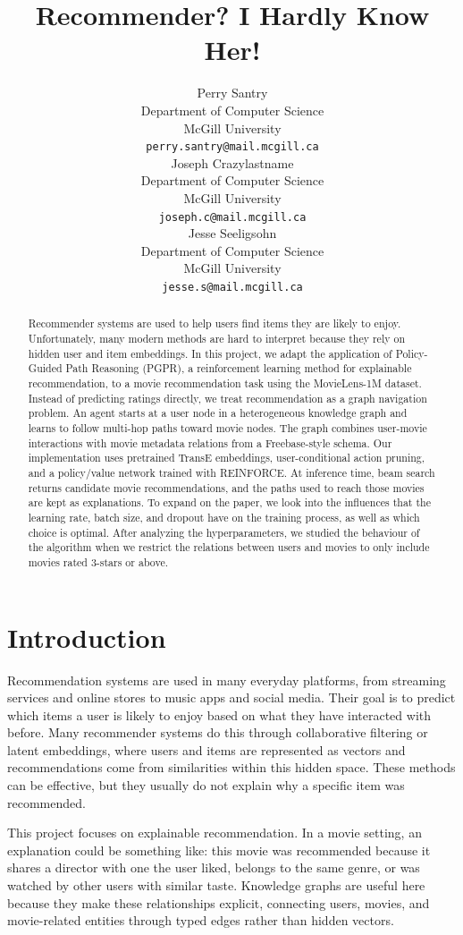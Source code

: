 \documentclass{article}
\title{Recommender? I Hardly Know Her!}
\author{%
  Perry Santry \\
  Department of Computer Science\\
  McGill University\\
  \texttt{perry.santry@mail.mcgill.ca} \\
  \And
  Joseph Crazylastname \\
  Department of Computer Science\\
  McGill University\\
  \texttt{joseph.c@mail.mcgill.ca} \\
  \And
  Jesse Seeligsohn \\
  Department of Computer Science\\
  McGill University\\
  \texttt{jesse.s@mail.mcgill.ca} \\
}
\begin{document}
\maketitle

\begin{abstract}
Recommender systems are used to help users find items they are likely to enjoy. Unfortunately, many modern methods are hard to interpret because they rely on hidden user and item embeddings. 
In this project, we adapt the application of Policy-Guided Path Reasoning (PGPR), a reinforcement learning method for explainable recommendation, to a movie recommendation task using 
the MovieLens-1M dataset. Instead of predicting ratings directly, we treat recommendation as a graph navigation problem. An agent starts at a user node in a heterogeneous knowledge 
graph and learns to follow multi-hop paths toward movie nodes. The graph combines user-movie interactions with movie metadata relations from a Freebase-style schema. 
Our implementation uses pretrained TransE embeddings, user-conditional action pruning, and a policy/value network trained with REINFORCE. At inference time, beam search 
returns candidate movie recommendations, and the paths used to reach those movies are kept as explanations. To expand on the paper, we look into the influences that the learning rate, batch size, 
and dropout have on the training process, as well as which choice is optimal. After analyzing the hyperparameters, we studied the behaviour of the algorithm when we restrict the relations between 
users and movies to only include movies rated 3-stars or above. 
\end{abstract}

\section{Introduction}
Recommendation systems are used in many everyday platforms, from streaming services and online stores to music apps and social media. Their goal is to predict which 
items a user is likely to enjoy based on what they have interacted with before. Many recommender systems do this through collaborative filtering or latent embeddings, 
where users and items are represented as vectors and recommendations come from similarities within this hidden space. These methods can be effective, but they usually do not 
explain why a specific item was recommended. 

This project focuses on explainable recommendation. In a movie setting, an explanation could be something like: this movie was recommended because it shares a director 
with one the user liked, belongs to the same genre, or was watched by other users with similar taste. Knowledge graphs are useful here because they make these 
relationships explicit, connecting users, movies, and movie-related entities through typed edges rather than hidden vectors.
\end{document}
